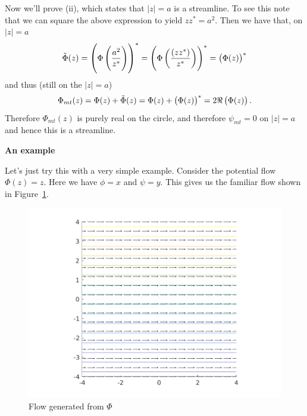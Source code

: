 \documentclass{article}
\def\ti#1{\tilde{#1}}
\begin{document}
Now we'll prove (ii), which states that $|z| = a$ is a streamline. To
see this note that we can square the above expression to yield $z z^* =
a^2$. Then we have that, on $|z| = a$
%
\begin{equation*}
    \ti\Phi(z)
        = \del{\Phi \del{\frac{a^2}{z^*}}}^*
        = \del{\Phi \del{\frac{(z z^*)}{z^*}}}^*
        = \del{\Phi(z)}^*
\end{equation*}
%
and thus (still on the $|z| = a$)
%
\begin{equation*}
    \Phi_{mt}(z) = \Phi(z) + \ti\Phi(z) = \Phi(z) + \del{\Phi(z)}^* = 2 \Re\del{\Phi(z)}
    .
\end{equation*}
%
Therefore $\Phi_{mt}(z)$ is purely real on the circle, and therefore
$\psi_{mt} = 0$ on $|z| = a$ and hence this is a streamline.

\textbf{An example}

Let's just try this with a very simple example. Consider the potential
flow $\Phi(z) = z$. Here we have $\phi = x$ and $\psi = y$. This gives
us the familiar flow shown in Figure~\ref{fig:mt-1}.
%
\begin{figure}[ht]
    \includegraphics[width=35em]{mt_ex1_1}
    \centering
    \caption{Flow generated from $\Phi$}
    \label{fig:mt-1}
\end{figure}
\end{document}
